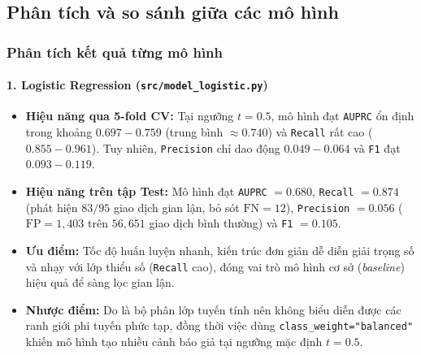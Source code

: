 \subsection{Phân tích và so sánh giữa các mô hình}\label{subsec:phan-tich-so-sanh}

\subsubsection{Phân tích kết quả từng mô hình}

\paragraph{1. Logistic Regression (\texttt{src/model\_logistic.py})}\mbox{}
\begin{itemize}
    \item \textbf{Hiệu năng qua 5-fold CV:} Tại ngưỡng $t = 0.5$, mô hình đạt \texttt{AUPRC} ổn định trong khoảng $0.697 - 0.759$ (trung bình $\approx 0.740$) và \texttt{Recall} rất cao ($0.855 - 0.961$). Tuy nhiên, \texttt{Precision} chỉ dao động $0.049 - 0.064$ và \texttt{F1} đạt $0.093 - 0.119$.
    \item \textbf{Hiệu năng trên tập Test:} Mô hình đạt \texttt{AUPRC} $= 0.680$, \texttt{Recall} $= 0.874$ (phát hiện $83/95$ giao dịch gian lận, bỏ sót $\text{FN} = 12$), \texttt{Precision} $= 0.056$ ($\text{FP} = 1{,}403$ trên $56{,}651$ giao dịch bình thường) và \texttt{F1} $= 0.105$.
    \item \textbf{Ưu điểm:} Tốc độ huấn luyện nhanh, kiến trúc đơn giản dễ diễn giải trọng số và nhạy với lớp thiểu số (\texttt{Recall} cao), đóng vai trò mô hình cơ sở (\textit{baseline}) hiệu quả để sàng lọc gian lận.
    \item \textbf{Nhược điểm:} Do là bộ phân lớp tuyến tính nên không biểu diễn được các ranh giới phi tuyến phức tạp, đồng thời việc dùng \texttt{class\_weight="balanced"} khiến mô hình tạo nhiều cảnh báo giả tại ngưỡng mặc định $t = 0.5$.
\end{itemize}

